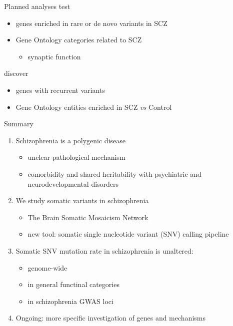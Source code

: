\documentclass[usenames,dvipsnames]{beamer}
\begin{document}
\begin{frame}{Planned analyses}
test
\begin{itemize}
\item genes enriched in rare or de novo variants in SCZ
\item Gene Ontology categories related to SCZ
\begin{itemize}
\item synaptic function
\end{itemize}
\end{itemize}

\vfill
discover
\begin{itemize}
\item genes with recurrent variants
\item Gene Ontology entities enriched in SCZ \textit{vs} Control
\end{itemize}
\end{frame}

\begin{frame}{Summary}
\begin{enumerate}
\item Schizophrenia is a polygenic disease
	\begin{itemize}
                \item unclear pathological mechanism
		\item comorbidity and shared heritability with psychiatric and
			neurodevelopmental disorders
	\end{itemize}
\item We study somatic variants in schizophrenia
	\begin{itemize}
		\item The Brain Somatic Mosaicism Network 
		\item new tool: somatic single nucleotide variant (SNV) calling pipeline
	\end{itemize}
\item Somatic SNV mutation rate in schizophrenia is unaltered:
	\begin{itemize}
		\item genome-wide
		\item in general functinal categories
                \item in schizophrenia GWAS loci
	\end{itemize}
\item Ongoing: more specific investigation of genes and mechanisms
\end{enumerate}
\end{frame}
\end{document}
